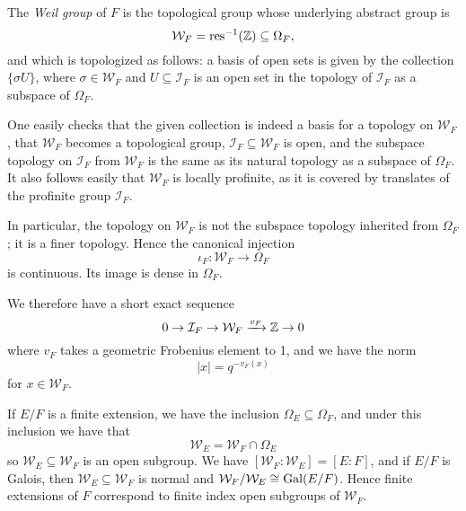 \begin{defn}
	The \emph{Weil group} of $F$ is the topological group whose underlying abstract group is 
	\[\mathcal{W}_F = \text{res}^{-1}(\mathbb{Z})\subseteq \Omega_F,\]
	and which is topologized as follows: a basis of open sets is given by the collection $\{\sigma U\}$, where $\sigma \in \mathcal{W}_F$ and $U\subseteq \mathcal{I}_F$ is an open set in the topology of $\mathcal{I}_F$ as a subspace of $\Omega_F$.
\end{defn}
One easily checks that the given collection is indeed a basis for a topology on $\mathcal{W}_F$, that $\mathcal{W}_F$ becomes a topological group, $\mathcal{I}_F\subseteq \mathcal{W}_F$ is open, and the subspace topology on $\mathcal{I}_F$ from $\mathcal{W}_F$ is the same as its natural topology as a subspace of $\Omega_F$. It also follows easily that $\mathcal{W}_F$ is locally profinite, as it is covered by translates of the profinite group $\mathcal{I}_F$.

In particular, the topology on $\mathcal{W}_F$ is not the subspace topology inherited from $\Omega_F$; it is a finer topology. Hence the canonical injection
\[\iota_F: \mathcal{W}_F\to \Omega_F\]
is continuous. Its image is dense in $\Omega_F$.

 We therefore have a short exact sequence
\[0 \to \mathcal{I}_F \to \mathcal{W}_F \xrightarrow{v_F} \mathbb{Z}\to 0\]
where $v_F$ takes a geometric Frobenius element to 1, and we have the norm
\[|x| = q^{-v_F(x)}\]
for $x\in \mathcal{W}_F$. 

If $E/F$ is a finite extension, we have the inclusion $\Omega_E\subseteq \Omega_F$, and under this inclusion we have that 
\[\mathcal{W}_E = \mathcal{W}_F \cap \Omega_E\]
so $\mathcal{W}_E\subseteq \mathcal{W}_F$ is an open subgroup. We have $[\mathcal{W}_F:\mathcal{W}_E] = [E:F]$, and if $E/F$ is Galois, then $\mathcal{W}_E\subseteq \mathcal{W}_F$ is normal and $\mathcal{W}_F/\mathcal{W}_E\cong \mathrm{Gal}(E/F)$. Hence finite extensions of $F$ correspond to finite index open subgroups of $\mathcal{W}_F$.

